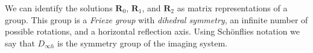 \documentclass[11pt]{article}
\providecommand{\mb}[1]{\mathbf{#1}}
\begin{document}
We can identify the solutions $\mb{R}_0$, $\mb{R}_1$, and $\mb{R}_2$ as matrix
representations of a group. This group is a \textit{Frieze group} with
\textit{dihedral symmetry}, an infinite number of possible rotations, and a
horizontal reflection axis. Using Sch\"onflies notation we say that
$D_{\infty h}$ is the symmetry group of the imaging system. 
\end{document}
